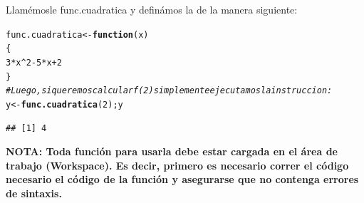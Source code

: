 \documentclass[12pt,letterpaper]{article}\usepackage[]{graphicx}\usepackage[]{color}
\makeatletter
\newcommand{\hlnum}[1]{\textcolor[rgb]{0.686,0.059,0.569}{#1}}%
\newcommand{\hlcom}[1]{\textcolor[rgb]{0.678,0.584,0.686}{\textit{#1}}}%
\newcommand{\hlopt}[1]{\textcolor[rgb]{0,0,0}{#1}}%
\newcommand{\hlstd}[1]{\textcolor[rgb]{0.345,0.345,0.345}{#1}}%
\newcommand{\hlkwa}[1]{\textcolor[rgb]{0.161,0.373,0.58}{\textbf{#1}}}%
\newcommand{\hlkwb}[1]{\textcolor[rgb]{0.69,0.353,0.396}{#1}}%
\newcommand{\hlkwc}[1]{\textcolor[rgb]{0.333,0.667,0.333}{#1}}%
\newcommand{\hlkwd}[1]{\textcolor[rgb]{0.737,0.353,0.396}{\textbf{#1}}}%
\newenvironment{kframe}{%
 \def\at@end@of@kframe{}%
 \ifinner\ifhmode%
  \def\at@end@of@kframe{\end{minipage}}%
  \begin{minipage}{\columnwidth}%
 \fi\fi%
 \def\FrameCommand##1{\hskip\@totalleftmargin \hskip-\fboxsep
 \colorbox{shadecolor}{##1}\hskip-\fboxsep
     \hskip-\linewidth \hskip-\@totalleftmargin \hskip\columnwidth}%
 \MakeFramed {\advance\hsize-\width
   \@totalleftmargin\z@ \linewidth\hsize
   \@setminipage}}%
 {\par\unskip\endMakeFramed%
 \at@end@of@kframe}
\newenvironment{knitrout}{}{} %
\makeatother
\begin{document}
Llam\'emosle func.cuadratica y defin\'amos la de la manera siguiente: 
\begin{knitrout}
\color{fgcolor}\begin{kframe}
\begin{alltt}
\hlstd{func.cuadratica} \hlkwb{<-} \hlkwa{function}\hlstd{(}\hlkwc{x}\hlstd{)}
\hlstd{\{}
\hlnum{3}\hlopt{*}\hlstd{x}\hlopt{^}\hlnum{2}\hlopt{-}\hlnum{5}\hlopt{*}\hlstd{x}\hlopt{+}\hlnum{2}
\hlstd{\}}
\hlcom{#Luego, si queremos calcular f(2) simplemente ejecutamos la instruccion: }
\hlstd{y} \hlkwb{<-} \hlkwd{func.cuadratica}\hlstd{(}\hlnum{2}\hlstd{);y}
\end{alltt}
\begin{verbatim}
## [1] 4
\end{verbatim}
\end{kframe}
\end{knitrout}

\textbf{NOTA: Toda funci\'on para usarla debe estar cargada en el \'area de trabajo (Workspace). Es decir, primero es necesario correr el c\'odigo necesario el c\'odigo de la funci\'on y asegurarse que no contenga errores de sintaxis.}\\ 
\end{document}
